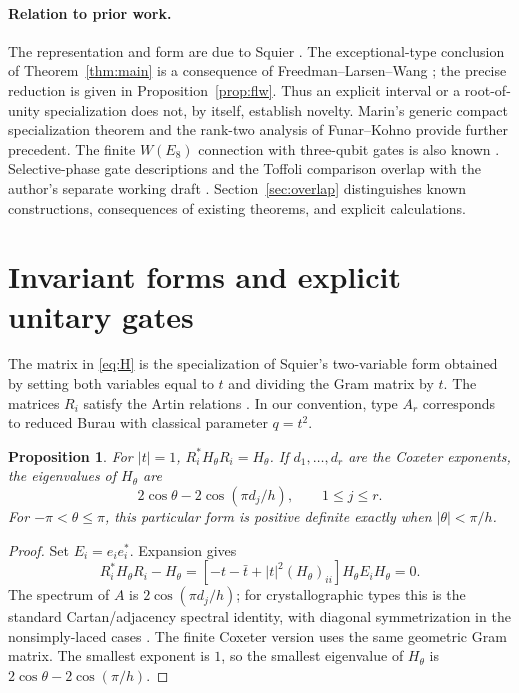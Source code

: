 \documentclass[11pt,a4paper]{article}
\newtheorem{proposition}[theorem]{Proposition}
\theoremstyle{remark}\newtheorem{remark}[theorem]{Remark}
\begin{document}
\paragraph{Relation to prior work.}
The representation and form are due to Squier \cite{Squier}.
The exceptional-type conclusion of Theorem~\ref{thm:main} is a
consequence of Freedman--Larsen--Wang \cite{FLW}; the precise reduction
is given in Proposition~\ref{prop:flw}.  Thus an explicit interval or a
root-of-unity specialization does not, by itself, establish novelty.
Marin's generic compact specialization theorem \cite[Theorem~4]{Marin}
and the rank-two analysis of Funar--Kohno \cite{FK} provide further
precedent.  The finite $W(E_8)$ connection with three-qubit gates is also
known \cite{Planat,ARW}.  Selective-phase gate descriptions and the Toffoli
comparison overlap with the author's separate working draft
\cite[Section~6]{Negami}.  Section~\ref{sec:overlap} distinguishes known
constructions, consequences of existing theorems, and explicit calculations.

\section{Invariant forms and explicit unitary gates}
The matrix in \eqref{eq:H} is the specialization of Squier's two-variable
form obtained by setting both variables equal to $t$ and dividing the
Gram matrix by $t$.  The matrices $R_i$ satisfy the Artin relations
\cite{Squier}.  In our convention, type $A_r$ corresponds to reduced
Burau with classical parameter $q=t^2$.

\begin{proposition}\label{prop:form}
For $|t|=1$, $R_i^*H_\theta R_i=H_\theta$.  If $d_1,\ldots,d_r$
are the Coxeter exponents, the eigenvalues of $H_\theta$ are
\begin{equation}\label{eq:spectrum}
 2\cos\theta-2\cos(\pi d_j/h),\qquad 1\leq j\leq r.
\end{equation}
For $-\pi<\theta\leq\pi$, this particular form is positive definite
exactly when $|\theta|<\pi/h$.
\end{proposition}
\begin{proof}
Set $E_i=e_ie_i^*$.  Expansion gives
\[
 R_i^*H_\theta R_i-H_\theta
 =[-t-\bar t+|t|^2(H_\theta)_{ii}]H_\theta E_iH_\theta=0.
\]
The spectrum of $A$ is $2\cos(\pi d_j/h)$; for crystallographic types
this is the standard Cartan/adjacency spectral identity, with diagonal
symmetrization in the nonsimply-laced cases \cite{Damianou}.
The finite Coxeter version uses the same geometric Gram matrix.
The smallest exponent is $1$, so the smallest eigenvalue of $H_\theta$
is $2\cos\theta-2\cos(\pi/h)$.
\end{proof}
\end{document}
